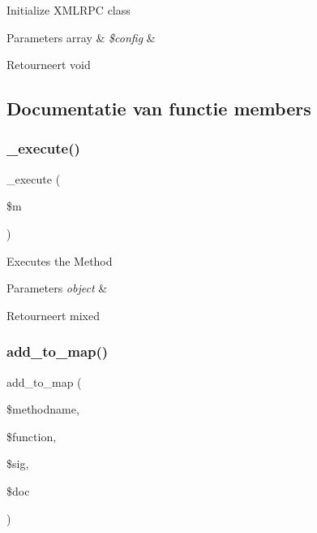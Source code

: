 Initialize X\+M\+L\+R\+PC class


\begin{DoxyParams}[1]{Parameters}
array & {\em \$config} & \\
\hline
\end{DoxyParams}
\begin{DoxyReturn}{Retourneert}
void 
\end{DoxyReturn}


\subsection{Documentatie van functie members}
\mbox{\label{class_c_i___xmlrpcs_a2f039adb8ec59c693300993c95138b46}} 
\subsubsection{\texorpdfstring{\_execute()}{\_execute()}}
{\footnotesize\ttfamily \+\_\+execute (\begin{DoxyParamCaption}\item[{}]{\$m }\end{DoxyParamCaption})\hspace{0.3cm}{\ttfamily [protected]}}

Executes the Method


\begin{DoxyParams}{Parameters}
{\em object} & \\
\hline
\end{DoxyParams}
\begin{DoxyReturn}{Retourneert}
mixed 
\end{DoxyReturn}
\mbox{\label{class_c_i___xmlrpcs_a73b29191620c55a5e2d3fda3a5c3cf44}} 
\subsubsection{\texorpdfstring{add\_to\_map()}{add\_to\_map()}}
{\footnotesize\ttfamily add\+\_\+to\+\_\+map (\begin{DoxyParamCaption}\item[{}]{\$methodname,  }\item[{}]{\$function,  }\item[{}]{\$sig,  }\item[{}]{\$doc }\end{DoxyParamCaption})}

